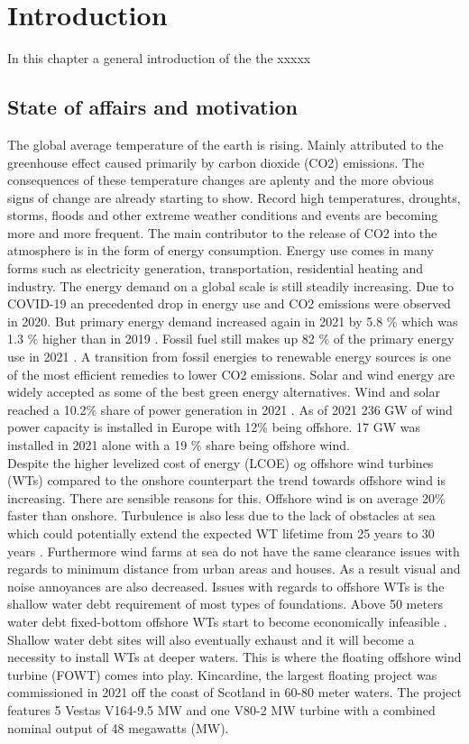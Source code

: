 \section{Introduction} \label{sec:intro}
In this chapter a general introduction of the the xxxxx

\subsection{State of affairs and motivation}
The global average temperature of the earth is rising. Mainly attributed to the greenhouse effect caused primarily by carbon dioxide (CO2) emissions. The consequences of these temperature changes are aplenty and the more obvious signs of change are already starting to show. Record high temperatures, droughts, storms, floods and other extreme weather conditions and events are becoming more and more frequent. The main contributor to the release of CO2 into the atmosphere is in the form of energy consumption. Energy use comes in many forms such as electricity generation, transportation, residential heating and industry. The energy demand on a global scale is still steadily increasing. Due to COVID-19 an precedented drop in energy use and CO2 emissions were observed in 2020. But primary energy demand increased again in 2021 by 5.8 \% which was 1.3 \% higher than in 2019 \cite{bp2022}. Fossil fuel still makes up 82 \% of the primary energy use in 2021 \cite{bp2022}. A transition from fossil energies to renewable energy sources is one of the most efficient remedies to lower CO2 emissions. Solar and wind energy are widely accepted as some of the best green energy alternatives. Wind and solar reached a 10.2\% share of power generation in 2021 \cite{bp2022}. As of 2021 236 GW of wind power capacity is installed in Europe with 12\% being offshore. 17 GW was installed in 2021 alone with a 19 \% share being offshore wind\cite{Sesto1992}. \\

Despite the higher levelized cost of energy (LCOE) og offshore wind turbines (WTs) compared to the onshore counterpart the trend towards offshore wind is increasing. There are sensible reasons for this. Offshore wind is on average 20\% faster than onshore. Turbulence is also less due to the lack of obstacles at sea which could potentially extend the expected WT lifetime from 25 years to 30 years \cite{Christiansen2013}. Furthermore wind farms at sea do not have the same clearance issues with regards to minimum distance from urban areas and houses. As a result visual and noise annoyances are also decreased. Issues with regards to offshore WTs is the shallow water debt requirement of most types of foundations. Above 50 meters water debt fixed-bottom offshore WTs start to become economically infeasible \cite{Lefebvre2012}. Shallow water debt sites will also eventually exhaust and it will become a necessity to install WTs at deeper waters. This is where the floating offshore wind turbine (FOWT) comes into play. Kincardine, the largest floating project was commissioned in 2021 off the coast of Scotland in 60-80 meter waters. The project features 5 Vestas V164-9.5 MW and one V80-2 MW turbine with a combined nominal output of 48 megawatts (MW). 

